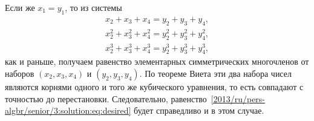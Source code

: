 Если же $x_1 = y_1$, то из системы
\begin{gather*}
    x_2 + x_3 + x_4 = y_2 + y_3 + y_4
,\\
    x_2^2 + x_3^2 + x_4^2 = y_2^2 + y_3^2 + y_4^2
,\\
    x_2^3 + x_3^3 + x_4^3 = y_2^3 + y_3^3 + y_4^3
,\end{gather*}
как и раньше, получаем равенство элементарных симметрических многочленов от
наборов $(x_2, x_3, x_4)$ и $(y_2, y_3, y_4)$.
По теореме Виета эти два набора чисел являются корнями одного и того же
кубического уравнения, то есть совпадают с точностью до перестановки.
Следовательно, равенство~\eqref{2013/ru/pers-algbr/senior/3:solution:eq:desired} будет
справедливо и в этом случае.
\endproblem
